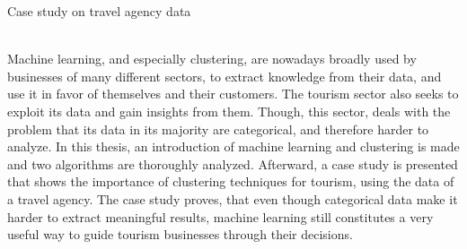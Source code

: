 \begin{center}
    \Large
    
    \vspace{0.4cm}
    \large
    Case study on travel agency data
    
    \vspace{0.4cm}
    
    \vspace{1.5cm}
\\
\vspace{25mm}
Machine learning, and especially clustering, are nowadays broadly used by businesses of many different sectors, to extract knowledge from their data, and use it in favor of themselves and their customers. The tourism sector also seeks to exploit its data and gain insights from them. Though, this sector, deals with the problem that its data in its majority are categorical, and therefore harder to analyze. In this thesis, an introduction of machine learning and clustering is made and two algorithms are thoroughly analyzed. Afterward, a case study is presented that shows the importance of clustering techniques for tourism, using the data of a travel agency. The case study proves, that even though categorical data make it harder to extract meaningful results, machine learning still constitutes a very useful way to guide tourism businesses through their decisions. 
\end{center}